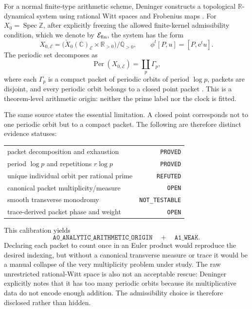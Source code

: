 \documentclass[11pt]{article}
\theoremstyle{definition}
\theoremstyle{remark}
\newcommand{\Spec}{\operatorname{Spec}}
\newcommand{\Per}{\operatorname{Per}}
\newcommand{\R}{\mathbb{R}}
\newcommand{\Q}{\mathbb{Q}}
\newcommand{\Z}{\mathbb{Z}}
\newcommand{\e}{\mathrm{e}}
\begin{document}
For a normal finite-type arithmetic scheme, Deninger constructs a topological
\(\R\)-dynamical system using rational Witt spaces and Frobenius maps
\citep{Deninger2026}.  For \(X_0=\Spec\Z\), after explicitly freezing the
allowed finite-kernel admissibility condition, which we denote by
\(\mathcal E_{\rm fin}\), the
system has the form
\begin{equation}
 X_{0,\mathcal E}=
 \bigl(\check X_0(\mathbb C)_{\mathcal E}\times\R_{>0}\bigr)/\Q_{>0},
 \qquad
 \phi^t[P,u]=[P,\e^t u].
 \label{eq:denflow}
\end{equation}
The periodic set decomposes as
\begin{equation}
 \Per(X_{0,\mathcal E})=\coprod_{p}\Gamma_p,
 \label{eq:packets}
\end{equation}
where each \(\Gamma_p\) is a compact packet of periodic orbits of period
\(\log p\), packets are disjoint, and every periodic orbit belongs to a closed
point packet \citep{Deninger2023,Deninger2026}.  This is a theorem-level
arithmetic origin: neither the prime label nor the clock is fitted.

The same source states the essential limitation.  A closed point corresponds
not to one periodic orbit but to a compact packet.  The following are therefore
distinct evidence statuses:
\begin{center}
\begin{tabular}{lr}
\toprule
packet decomposition and exhaustion & \texttt{PROVED}\\
period \(\log p\) and repetitions \(r\log p\) & \texttt{PROVED}\\
unique individual orbit per rational prime & \texttt{REFUTED}\\
canonical packet multiplicity/measure & \texttt{OPEN}\\
smooth transverse monodromy & \texttt{NOT\_TESTABLE}\\
trace-derived packet phase and weight & \texttt{OPEN}\\
\bottomrule
\end{tabular}
\end{center}

This calibration yields
\[
 \texttt{A0\_ANALYTIC\_ARITHMETIC\_ORIGIN}
 \quad+\quad
 \texttt{A1\_WEAK}.
\]
Declaring each packet to count once in an Euler product would reproduce the
desired indexing, but without a canonical transverse measure or trace it would
be a manual collapse of the very multiplicity problem under study.  The raw
unrestricted rational-Witt space is also not an acceptable rescue: Deninger
explicitly notes that it has too many periodic orbits because its
multiplicative data do not encode enough addition.  The admissibility choice is
therefore disclosed rather than hidden.
\end{document}
